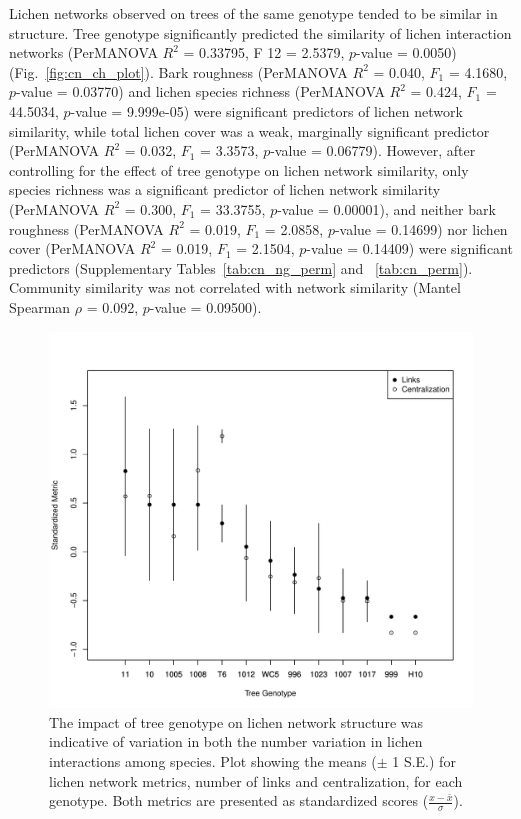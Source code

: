 \documentclass[9pt,twocolumn,twoside,lineno]{pnas-new}
\begin{document}
{Lichen networks observed on trees of the same genotype tended to be
similar in structure. Tree genotype significantly predicted the
similarity of lichen interaction networks (PerMANOVA $R^2$ = 0.33795,
F 12 = 2.5379, $p$-value = 0.0050) (Fig.~\ref{fig:cn_ch_plot}). Bark
roughness (PerMANOVA $R^2$ = 0.040, $F_1$ = 4.1680, $p$-value =
0.03770) and lichen species richness (PerMANOVA $R^2$ = 0.424, $F_1$ =
44.5034, $p$-value = 9.999e-05) were significant predictors of lichen
network similarity, while total lichen cover was a weak, marginally
significant predictor (PerMANOVA $R^2$ = 0.032, $F_1$ = 3.3573,
$p$-value = 0.06779). However, after controlling for the effect of
tree genotype on lichen network similarity, only species richness was
a significant predictor of lichen network similarity (PerMANOVA $R^2$
= 0.300, $F_1$ = 33.3755, $p$-value = 0.00001), and neither bark
roughness (PerMANOVA $R^2$ = 0.019, $F_1$ = 2.0858, $p$-value =
0.14699) nor lichen cover (PerMANOVA $R^2$ = 0.019, $F_1$ = 2.1504,
$p$-value = 0.14409) were significant predictors (Supplementary
Tables~\ref{tab:cn_ng_perm} and ~\ref{tab:cn_perm}). Community
similarity was not correlated with network similarity (Mantel Spearman
$\rho$ = 0.092, $p$-value = 0.09500).


\begin{figure}[ht]
\centering
\includegraphics[width=\linewidth]{cn_metrics.pdf}
\caption{The impact of tree genotype on lichen network structure was
  indicative of variation in both the number variation in lichen
  interactions among species. Plot showing the means ($\pm$ 1 S.E.)
  for lichen network metrics, number of links and centralization, for
  each genotype. Both metrics are presented as standardized scores
  ($\frac{x - \bar{x}}{\sigma}$).}
\label{fig:cn_metrics}
\end{figure}


}
\end{document}
